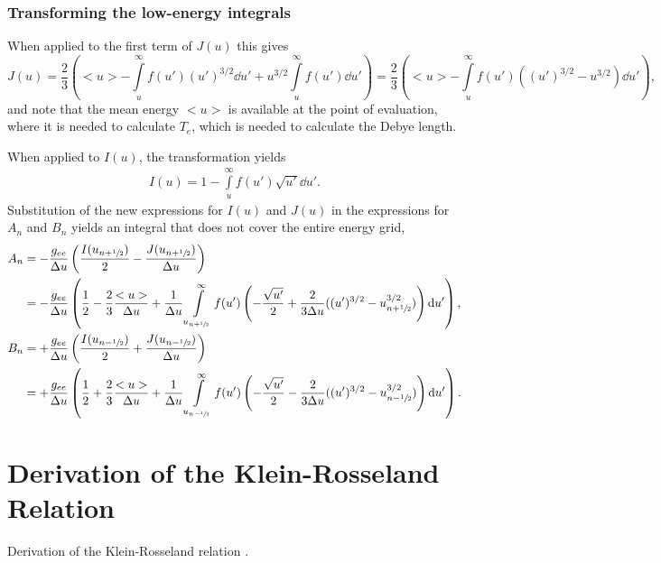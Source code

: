 \documentclass{book}
\newcommand{\frachalf}{\ensuremath{\sfrac{1}{2}}}
\newcommand{\phalf}[1]{\ensuremath{{#1}+\frachalf}}
\newcommand{\mhalf}[1]{\ensuremath{{#1}-\frachalf}}
\begin{document}
\subsection{Transforming the low-energy integrals}
When applied to the first term of $J(u)$ this gives
\begin{equation}
	J(u)
	= \frac{2}{3}\left(
		<u>
		-
		\int\limits_u^\infty f(u')(u')^{3/2}\dd{u'}
		+
		u^{3/2}\int\limits_u^\infty f(u')\dd{u'}
	\right)
	= \frac{2}{3}\left(
		<u>
		-
		\int\limits_u^\infty f(u')((u')^{3/2}-u^{3/2})\dd{u'}
	\right),
\end{equation}
and note that the mean energy $<u>$ is available at the point of evaluation, where
it is needed to calculate $T_e$, which is needed to calculate the Debye length.

When applied to $I(u)$, the transformation yields
\begin{align}
	I(u) = 1 - \int\limits_u^\infty f(u')\sqrt{u'}\dd{u'}.
\end{align}
Substitution of the new expressions for $I(u)$ and $J(u)$ in the expressions for $A_n$
and $B_n$ yields an integral that does not cover the entire energy grid,
\begin{align}
	A_n &= -\frac{g_{ee}}{\Delta u}\left(\frac{I(u_{\phalf{n}})}{2} - \frac{J(u_{\phalf{n}})}{\Delta u}\right)
		\nonumber \\
	&= -\frac{g_{ee}}{\Delta u}\left(
		\frac{1}{2} - \frac{2}{3}\frac{<u>}{\Delta u}
		+ \frac{1}{\Delta u}\int\limits_{u_{\phalf{n}}}^\infty f(u')\left(-\frac{\sqrt{u'}}{2} + \frac{2}{3\Delta u}((u')^{3/2}-u_{\phalf{n}}^{3/2})\right)\dd{u'}
		\right),
		\\
	B_n &= +\frac{g_{ee}}{\Delta u}\left(\frac{I(u_{\mhalf{n}})}{2} + \frac{J(u_{\mhalf{n}})}{\Delta u}\right)
		\nonumber \\
	&= +\frac{g_{ee}}{\Delta u}\left(
		\frac{1}{2} + \frac{2}{3}\frac{<u>}{\Delta u}
		+ \frac{1}{\Delta u}\int\limits_{u_{\mhalf{n}}}^\infty f(u')\left(-\frac{\sqrt{u'}}{2} - \frac{2}{3\Delta u}((u')^{3/2}-u_{\mhalf{n}}^{3/2})\right)\dd{u'}
		\right).
\end{align}

\chapter{Derivation of the Klein-Rosseland Relation}

\label{app:KleinRosseland}
Derivation of the Klein-Rosseland relation \cite{Klein1921}.
\end{document}
